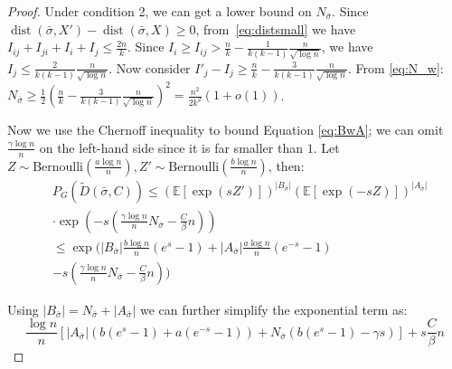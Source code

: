 \documentclass[entropy,article,accept,moreauthors,pdftex]{Definitions/mdpi}
\newcommand{\A}{\frac{a \log n}{n}}
\newcommand{\B}{\frac{b \log n}{n}}
\newcommand{\1}{\mathbbm{1}}
\DeclareMathOperator{\Dist}{dist}
\begin{document}
\begin{paracol}{2}
\begin{proof}
	
	Under condition 2, we can get a lower bound on $N_{\bar{\sigma}}$. Since
	$\Dist(\bar{\sigma}, X') - \Dist(\bar{\sigma}, X) \geq 0$, from~\eqref{eq:distsmall} we have
	$I_{ij} + I_{ji} + I_{i} + I_j \leq \frac{2n}{k} $.
	Since $I_i \geq I_{ij} > \frac{n}{k} - \frac{1}{k(k-1)}\frac{n}{\sqrt{\log n}}$,
	we have\linebreak $I_j \leq \frac{2}{k(k-1)}\frac{n}{\sqrt{\log n} }$.
	Now consider $I'_j - I_j \geq  \frac{n}{k} - \frac{3}{k(k-1)}\frac{n}{\sqrt{\log n} }$.
	From \eqref{eq:N_w}:\linebreak $N_{\bar{\sigma}} \geq \frac{1}{2}(\frac{n}{k} - \frac{3}{k(k-1)}\frac{n}{\sqrt{\log n}})^2 = \frac{n^2}{2k^2}(1+o(1))$.
	
	Now we use the Chernoff inequality to bound Equation \eqref{eq:BwA}; we can omit $\frac{\gamma \log n}{n}$ on the left-hand side since it is far smaller than $1$.
	Let $Z \sim \textrm{Bernoulli}(\A), Z' \sim \textrm{Bernoulli}(\B)$, then:
	\begin{align*}
	&P_G(\widetilde{D}(\bar{\sigma}, C))
	\leq (\mathbb{E}[\exp(sZ')])^{|B_{\bar{\sigma}}|}(\mathbb{E}[\exp(-sZ)])^{|A_{\bar{\sigma}}|}\\
	&\cdot \exp(-s(\frac{\gamma \log n}{n} N_{\bar{\sigma}}  - \frac{C}{\beta}n)) \\
	& \leq \exp\Big(|B_{\bar{\sigma}}|\frac{b\log n}{n}(e^s -1) + |A_{\bar{\sigma}}|\frac{a\log n}{n} (e^{-s} - 1) \\
	&-s(\frac{\gamma \log n}{n} N_{\bar{\sigma}}  - \frac{C}{\beta}n)\Big) 
	\end{align*}
	
	Using $|B_{\bar{\sigma}}| = N_{\bar{\sigma}} + |A_{\bar{\sigma}}|$ we can further simplify the exponential term as:
	$$
	\frac{\log n}{n} [|A_{\bar{\sigma}}|(b(e^s -1)+ a(e^{-s} - 1)) +
	N_{\bar{\sigma}} (b(e^s - 1)-\gamma s)]  + s \frac{C}{\beta}n
	$$
	

\end{proof}
\end{paracol}
\end{document}
